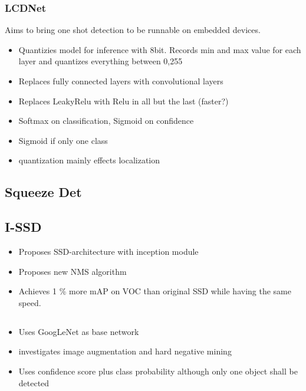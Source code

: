 \documentclass{article}
\begin{document}
	\subsubsection{LCDNet\cite{TripathiSanDiego}}
	
	Aims to bring one shot detection to be runnable on embedded devices.
	
	\begin{itemize}
		\item Quantizies model for inference with 8bit. Records min and max value for each layer and quantizes everything between 0,255
		\item Replaces fully connected layers with convolutional layers
		\item Replaces LeakyRelu with Relu in all but the last (faster?)
		\item Softmax on classification, Sigmoid on confidence
		\item Sigmoid if only one class
		\item quantization mainly effects localization
	\end{itemize}
	
	\subsection{Squeeze Det \cite{Wu}}
	
	\subsection{I-SSD \cite{ChengchengNing2017}}

	\begin{itemize}
		\item Proposes SSD-architecture with inception module
		\item Proposes new NMS algorithm
		\item Achieves 1 \% more mAP on VOC than original SSD while having the same speed.
	\end{itemize}
	
	\subsection{\cite{Linb}}
	
	\begin{itemize}
		\item Uses GoogLeNet as base network
		\item investigates image augmentation and hard negative mining
		\item Uses confidence score plus class probability although only one object shall be detected
	\end{itemize}
		
\end{document}
